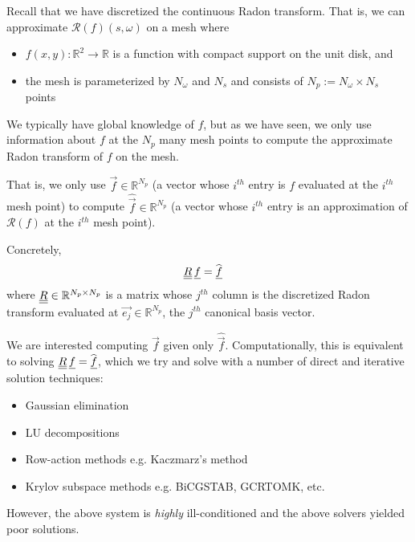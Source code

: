 Recall that we have discretized the continuous Radon transform.
That is, we can approximate $\mathcal{R} \left( f \right) \left( s, \omega \right)$ on a mesh where
\begin{itemize}
    \item $f \left( x, y \right) : \mathbb{R}^{2} \rightarrow \mathbb{R}$ is a function with compact support on the unit disk, and 
    \item the mesh is parameterized by $N_{\omega}$ and $N_{s}$ and consists of $N_{p} := N_{\omega} \times N_{s}$ points
\end{itemize}
We typically have global knowledge of $f$, but as we have seen, we only use information about $f$ at the $N_p$ many mesh points to compute the approximate Radon transform of $f$ on the mesh.
\par 
That is, we only use $\vec{f} \in \mathbb{R}^{N_{p}}$ (a vector whose $i^{th}$ entry is $f$ evaluated at the $i^{th}$ mesh point) to compute $\widehat{\vec{f}} \in \mathbb{R}^{N_{p}}$ (a vector whose $i^{th}$ entry is an approximation of $\mathcal{R} \left( f \right)$ at the $i^{th}$ mesh point).
\par 
Concretely,
\begin{align}
    {\underline{\underline{R}}} \, {\underline{f}} & = \widehat{{\underline{f}}}
\end{align}
where ${\underline{\underline{R}}} \in \mathbb{R}^{N_{p} \times N_{p}}$ is a matrix whose $j^{th}$ column is the discretized Radon transform evaluated at $\vec{e_{j}} \in \mathbb{R}^{N_{p}}$, the $j^{th}$ canonical basis vector. 
\par 
\par 
We are interested computing $\vec{f}$ given only $\widehat{\vec{f}}$.
Computationally, this is equivalent to solving ${\underline{\underline{R}}} \, {\underline{f}} = \widehat{{\underline{f}}}$, which we try and solve with a number of direct and iterative solution techniques:
\begin{itemize}
    \item Gaussian elimination
    \item LU decompositions
    \item Row-action methods e.g. Kaczmarz's method
    \item Krylov subspace methods e.g. BiCGSTAB, GCRTOMK, etc.
\end{itemize}
However, the above system is \textit{highly} ill-conditioned and the above solvers yielded poor solutions.
